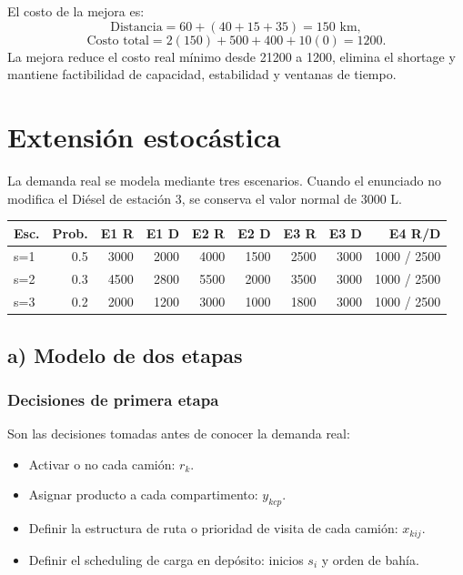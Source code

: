 \documentclass[11pt,letterpaper]{article}
\begin{document}
El costo de la mejora es:
\[
\text{Distancia}=60+(40+15+35)=150\text{ km},
\]
\[
\text{Costo total}=2(150)+500+400+10(0)=1200.
\]
La mejora reduce el costo real mínimo desde 21200 a 1200, elimina el shortage y mantiene
factibilidad de capacidad, estabilidad y ventanas de tiempo.

\section{Extensión estocástica}

La demanda real se modela mediante tres escenarios. Cuando el enunciado no modifica el Diésel
de estación 3, se conserva el valor normal de 3000 L.

\begin{table}[h]
\centering
\begin{tabular}{lrrrrrrrr}
\toprule
\textbf{Esc.} & \textbf{Prob.} & \textbf{E1 R} & \textbf{E1 D} & \textbf{E2 R} & \textbf{E2 D} & \textbf{E3 R} & \textbf{E3 D} & \textbf{E4 R/D} \\
\midrule
s=1 & 0.5 & 3000 & 2000 & 4000 & 1500 & 2500 & 3000 & 1000 / 2500 \\
s=2 & 0.3 & 4500 & 2800 & 5500 & 2000 & 3500 & 3000 & 1000 / 2500 \\
s=3 & 0.2 & 2000 & 1200 & 3000 & 1000 & 1800 & 3000 & 1000 / 2500 \\
\bottomrule
\end{tabular}
\end{table}

\subsection{a) Modelo de dos etapas}

\subsubsection*{Decisiones de primera etapa}
Son las decisiones tomadas antes de conocer la demanda real:
\begin{itemize}[leftmargin=*]
    \item Activar o no cada camión: \(r_k\).
    \item Asignar producto a cada compartimento: \(y_{kcp}\).
    \item Definir la estructura de ruta o prioridad de visita de cada camión: \(x_{kij}\).
    \item Definir el scheduling de carga en depósito: inicios \(s_i\) y orden de bahía.
\end{itemize}
\end{document}
